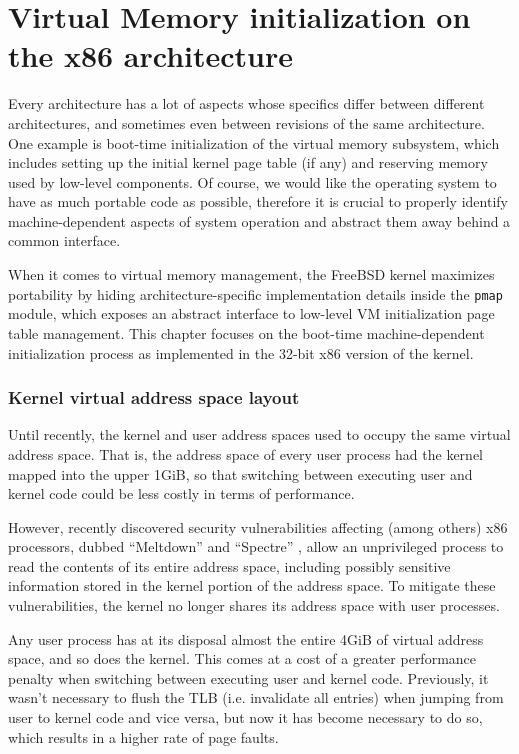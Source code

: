 \documentclass[shortabstract, english]{iithesis}
\begin{document}
\chapter{Virtual Memory initialization on the x86 architecture}

Every architecture has a lot of aspects whose specifics differ between different
architectures, and sometimes even between revisions of the same architecture.
One example is boot-time initialization of the virtual memory subsystem, which
includes setting up the initial kernel page table (if any) and reserving memory
used by low-level components. Of course, we would like the operating system to
have as much portable code as possible, therefore it is crucial to properly
identify machine-dependent aspects of system operation and abstract them away
behind a common interface.

When it comes to virtual memory management, the FreeBSD kernel maximizes
portability by hiding architecture-specific implementation details inside the
\texttt{pmap} \cite{freebsd:pmap} module, which exposes an abstract interface to
low-level VM initialization page table management. This chapter focuses on the
boot-time machine-dependent initialization process as implemented in the 32-bit
x86 version of the kernel.

\subsection{Kernel virtual address space layout}

Until recently, the kernel and user address spaces used to occupy the same
virtual address space. That is, the address space of every user process had the
kernel mapped into the upper 1GiB, so that switching between executing user and
kernel code could be less costly in terms of performance.

However, recently discovered security vulnerabilities affecting (among others)
x86 processors, dubbed ``Meltdown'' \cite{bib:meltdown} and ``Spectre''
\cite{bib:spectre}, allow an unprivileged process to read the contents of its
entire address space, including possibly sensitive information stored in the
kernel portion of the address space. To mitigate these vulnerabilities, the
kernel no longer shares its address space with user processes.

Any user process has at its disposal almost the entire 4GiB of virtual address
space, and so does the kernel. This comes at a cost of a greater performance
penalty when switching between executing user and kernel code. Previously, it
wasn't necessary to flush the TLB (i.e. invalidate all entries) when jumping
from user to kernel code and vice versa, but now it has become necessary to do
so, which results in a higher rate of page faults.
\end{document}
